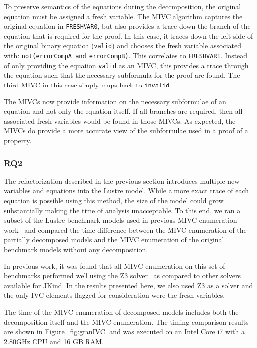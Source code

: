 To preserve semantics of the equations during the decomposition, the original equation must be assigned a fresh variable. The MIVC algorithm captures the original equation in \texttt{FRESHVAR0}, but also provides a trace down the branch of the equation that is required for the proof. In this case, it traces down the left side of the original binary equation (\texttt{valid}) and chooses the fresh variable associated with: \texttt{not(errorCompA and errorCompB)}. This correlates to \texttt{FRESHVAR1}. Instead of only providing the equation \texttt{valid} as an MIVC, this provides a trace through the equation such that the necessary subformula for the proof are found. The third MIVC in this case simply maps back to \texttt{invalid}. 

The MIVCs now provide information on the necessary subformulae of an equation and not only the equation itself. If all branches are required, then all associated fresh variables would be found in those MIVCs. As expected, the MIVCs do provide a more accurate view of the subformulae used in a proof of a property. 

\subsubsection{RQ2}
The refactorization described in the previous section introduces multiple new variables and equations into the Lustre model. While a more exact trace of each equation is possible using this method, the size of the model could grow substantially making the time of analysis unacceptable. To this end, we ran a subset of the Lustre benchmark models used in previous MIVC enumeration work~\cite{ghassabani_2018} and compared the time difference between the MIVC enumeration of the partially decomposed models and the MIVC enumeration of the original benchmark models without any decomposition. 

In previous work, it was found that all MIVC enumeration on this set of benchmarks performed well using the Z3 solver~\cite{ghassabani_2018, z3} as compared to other solvers available for JKind. In the results presented here, we also used Z3 as a solver and the only IVC elements flagged for consideration were the fresh variables. 

The time of the MIVC enumeration of decomposed models includes both the decomposition itself and the MIVC enumeration. The timing comparison results are shown in Figure~\ref{fig:granIVC} and was executed on an Intel Core i7 with a 2.80GHz CPU and 16 GB RAM. 

